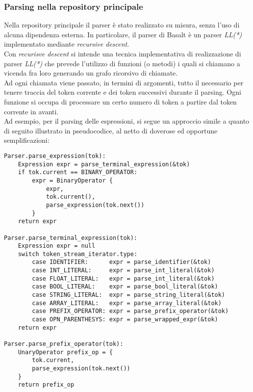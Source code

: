 \subsubsection{Parsing nella repository principale}
Nella repository principale il parser è
stato realizzato su misura, senza l'uso di alcuna
dipendenza esterna. In particolare, il parser di Basalt è un 
parser \textit{LL(*)} implementato 
mediante \textit{recursive descent}. \\

Con \textit{recurisve descent} si intende una tecnica implementativa 
di realizzazione di parser \textit{LL(*)} che prevede l'utilizzo di 
funzioni (o metodi) i quali si chiamano a vicenda fra loro generando 
un grafo ricorsivo di chiamate. \\

Ad ogni chiamata viene passato, in termini di argomenti, tutto il necessario 
per tenere traccia del token corrente e dei token successivi durante il 
parsing. Ogni funzione si occupa di processare un certo numero di 
token a partire dal token corrente in avanti. \\

Ad esempio, per il parsing delle espressioni, si segue un approccio 
simile a quanto di seguito illustrato in pseudocodice, al netto di 
doverose ed opportune semplificazioni:


\vspace{0.5cm}
\begin{lstlisting}[frame=single]
Parser.parse_expression(tok):
    Expression expr = parse_terminal_expression(&tok)
    if tok.current == BINARY_OPERATOR:
        expr = BinaryOperator {
            expr,
            tok.current(),
            parse_expression(tok.next())
        }
    return expr

Parser.parse_terminal_expression(tok):
    Expression expr = null
    switch token_stream_iterator.type:
        case IDENTIFIER:      expr = parse_identifier(&tok)
        case INT_LITERAL:     expr = parse_int_literal(&tok)
        case FLOAT_LITERAL:   expr = parse_int_literal(&tok)
        case BOOL_LITERAL:    expr = parse_bool_literal(&tok)
        case STRING_LITERAL:  expr = parse_string_literal(&tok)
        case ARRAY_LITERAL:   expr = parse_array_literal(&tok)
        case PREFIX_OPERATOR: expr = parse_prefix_operator(&tok)
        case OPN_PARENTHESYS: expr = parse_wrapped_expr(&tok)
    return expr

Parser.parse_prefix_operator(tok):
    UnaryOperator prefix_op = { 
        tok.current, 
        parse_expression(tok.next()) 
    }
    return prefix_op

\end{lstlisting}
\vspace{0.5cm}